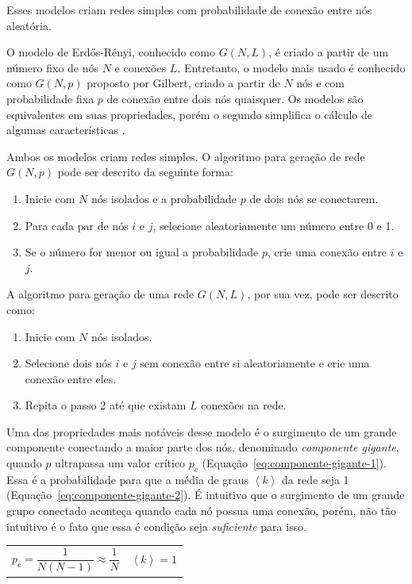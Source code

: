 \documentclass[12pt,a4paper]{article}
\theoremstyle{hypo}
\newcommand{\avg}[1]{\left\langle #1 \right\rangle} %
\begin{document}
Esses modelos criam redes simples com probabilidade de conexão entre nós aleatória.

O modelo de Erdős-Rényi, conhecido como $G(N,L)$, é criado a partir de um número fixo de nós $N$ e conexões $L$. Entretanto, o modelo mais usado é conhecido como $G(N,p)$ proposto por Gilbert, criado a partir de $N$ nós e com probabilidade fixa $p$ de conexão entre dois nós quaisquer. Os modelos são equivalentes em suas propriedades, porém o segundo simplifica o cálculo de algumas características \cite{Barabasi2016-rn}.

Ambos os modelos criam redes simples. O algoritmo para geração de rede $G(N, p)$ pode ser descrito da seguinte forma:

\begin{enumerate}
\item Inicie com $N$ nós isolados e a probabilidade $p$ de dois nós se conectarem.

\item Para cada par de nós $i$ e $j$, selecione aleatoriamente um número entre 0 e 1.

\item Se o número for menor ou igual a probabilidade $p$, crie uma conexão entre $i$ e $j$.
\end{enumerate}

A algoritmo para geração de uma rede $G(N, L)$, por sua vez,  pode ser descrito como:

\begin{enumerate}
\item Inicie com $N$ nós isolados.
\item Selecione dois nós $i$ e $j$ sem conexão entre si aleatoriamente e crie uma conexão entre eles.
\item Repita o passo 2 até que existam $L$ conexões na rede.
\end{enumerate}

Uma das propriedades mais notáveis desse modelo é o surgimento de um grande componente conectando a maior parte dos nós, denominado \textit{componente gigante}, quando $p$ ultrapassa um valor crítico $p_c$ (Equação~\ref{eq:componente-gigante-1}). Essa é a probabilidade para que a média de graus $\avg{k}$ da rede seja 1 (Equação~\ref{eq:componente-gigante-2}). É intuitivo que o surgimento de um grande grupo conectado aconteça quando cada nó possua uma conexão, porém, não tão intuitivo é o fato que essa é condição seja \textit{suficiente} para isso.

\noindent
\begin{tabularx}{\linewidth}{@{}XX@{}}
    \begin{equation} \label{eq:componente-gigante-1}
        p_c = \frac{1}{N(N - 1)} \approx \frac{1}{N}
    \end{equation} &
    \begin{equation} \label{eq:componente-gigante-2}
        \avg{k} = 1
    \end{equation}
\end{tabularx}
\end{document}
